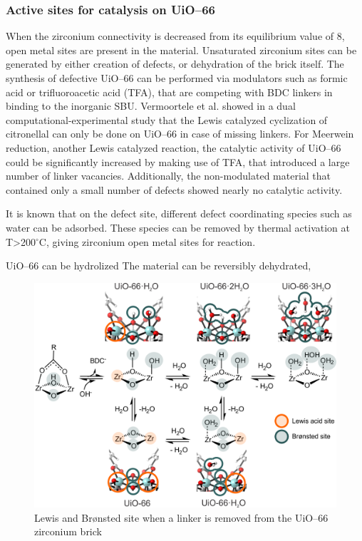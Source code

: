 \subsubsection*{Active sites for catalysis on UiO--66}
When the zirconium connectivity is decreased from its equilibrium value of 8, open metal sites are present in the material. Unsaturated zirconium sites can be generated by either creation of defects, or dehydration of the brick itself. 
The synthesis of defective UiO--66 can be performed via modulators such as formic acid or trifluoroacetic acid (TFA), that are competing with BDC linkers in binding to the inorganic SBU. 
Vermoortele et al. showed in a dual computational-experimental study that the Lewis catalyzed cyclization of citronellal can only be done on UiO--66 in case of missing linkers\cite{vermoortele2012electronic}. For Meerwein reduction, another Lewis catalyzed reaction, the catalytic activity of UiO--66 could be significantly increased by making use of TFA, that introduced a large number of linker vacancies. Additionally, the non-modulated material that contained only a small number of defects showed nearly no catalytic activity\cite{vermoortele2013synthesis}. 

It is known that on the defect site, different defect coordinating species such as water can be adsorbed. These species can be removed by thermal activation at T>200$^{\circ}$C, giving zirconium open metal sites for reaction. 



UiO--66 can be hydrolized \cite{decoste2013stability}
The material can be reversibly dehydrated,

\begin{figure}[!htbp]
	\centering
 	\includegraphics[width=1.0\textwidth]{bronsted-lewis-uio}
	\caption{Lewis and Br\o{}nsted site when a linker is removed from the UiO--66 zirconium brick}
	\label{fig:bronsted-lewis-uio}
\end{figure}

